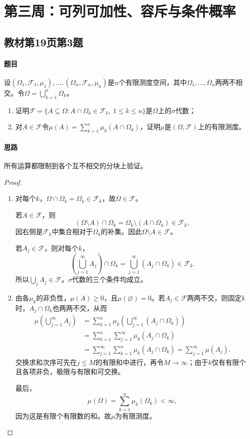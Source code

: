 \clearpage\section{第三周：可列可加性、容斥与条件概率}
\subsection{教材第19页第3题}\label{ex:w03-t3}
\paragraph{题目}
设$(\Omega_1,\mathscr F_1,\mu_1),\ldots,(\Omega_n,\mathscr F_n,\mu_n)$是$n$个有限测度空间，其中$\Omega_1,\ldots,\Omega_n$两两不相交。令$\Omega=\bigcup_{k=1}^n\Omega_k$。
\begin{enumerate}[label=(\arabic*)]
\item 证明$\mathscr F=\{A\subseteq\Omega:A\cap\Omega_k\in\mathscr F_k,\ 1\leq k\leq n\}$是$\Omega$上的$\sigma$代数；
\item 对$A\in\mathscr F$令$\mu(A)=\sum_{k=1}^n\mu_k(A\cap\Omega_k)$，证明$\mu$是$(\Omega,\mathscr F)$上的有限测度。
\end{enumerate}
\paragraph{思路}所有运算都限制到各个互不相交的分块上验证。
\begin{proof}
\begin{enumerate}[label=(\arabic*)]
\item 对每个$k$，$\Omega\cap\Omega_k=\Omega_k\in\mathscr F_k$，故$\Omega\in\mathscr F$。

若$A\in\mathscr F$，则
\[(\Omega\setminus A)\cap\Omega_k=\Omega_k\setminus(A\cap\Omega_k)\in\mathscr F_k,\]
因右侧是$\mathscr F_k$中集合相对于$\Omega_k$的补集。因此$\Omega\setminus A\in\mathscr F$。

若$A_j\in\mathscr F$，则对每个$k$，
\[\left(\bigcup_{j=1}^{\infty}A_j\right)\cap\Omega_k
=\bigcup_{j=1}^{\infty}(A_j\cap\Omega_k)\in\mathscr F_k.\]
所以$\bigcup_jA_j\in\mathscr F$。$\sigma$代数的三个条件均成立。
\item 由各$\mu_k$的非负性，$\mu(A)\geq0$，且$\mu(\varnothing)=0$。若$A_j\in\mathscr F$两两不交，则固定$k$时，$A_j\cap\Omega_k$也两两不交，从而
\begin{align*}
\mu\left(\bigcup_{j=1}^{\infty}A_j\right)
&=\sum_{k=1}^n\mu_k\left(\bigcup_{j=1}^{\infty}(A_j\cap\Omega_k)\right)\\
&=\sum_{k=1}^n\sum_{j=1}^{\infty}\mu_k(A_j\cap\Omega_k)\\
&=\sum_{j=1}^{\infty}\sum_{k=1}^n\mu_k(A_j\cap\Omega_k)
=\sum_{j=1}^{\infty}\mu(A_j).
\end{align*}
交换求和次序可先在$j\leq M$的有限和中进行，再令$M\to\infty$；由于$k$仅有有限个且各项非负，极限与有限和可交换。

最后，
\[\mu(\Omega)=\sum_{k=1}^n\mu_k(\Omega_k)<\infty,\]
因为这是有限个有限数的和。故$\mu$为有限测度。
\end{enumerate}
\end{proof}
